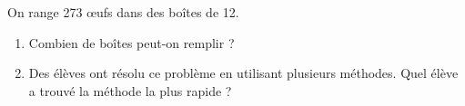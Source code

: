 \documentclass[activite]{thedocument}
\begin{document}
    On range 273 \oe ufs dans des boîtes de 12.
    \begin{enumerate}
        \item Combien de boîtes peut-on remplir ?
        \dotedline
        \dotedline
        \dotedline
        \dotedline
        \item Des élèves ont résolu ce problème en utilisant plusieurs méthodes.
        Quel élève a trouvé la méthode la plus rapide ?
    \end{enumerate}
    \vskip10pt
    \begin{center}
    \end{center}
\end{document}
